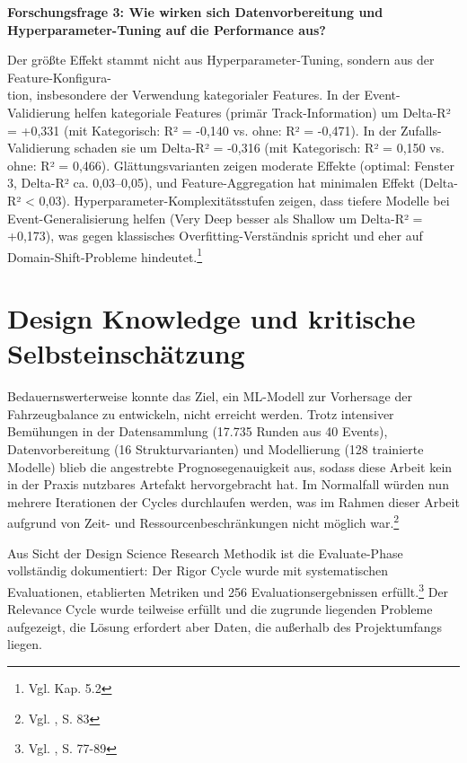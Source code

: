 \textbf{Forschungsfrage 3: Wie wirken sich Datenvorbereitung und Hyperparameter-Tuning auf die Performance aus?}

Der größte Effekt stammt nicht aus Hyperparameter-Tuning, sondern aus der Feature-Konfigura-\\tion, insbesondere der Verwendung kategorialer Features. In der Event-Validierung helfen kategoriale Features (primär Track-Information) um Delta-R² = +0,331 (mit Kategorisch: R² = -0,140 vs. ohne: R² = -0,471). In der Zufalls-Validierung schaden sie um Delta-R² = -0,316 (mit Kategorisch: R² = 0,150 vs. ohne: R² = 0,466). Glättungsvarianten zeigen moderate Effekte (optimal: Fenster 3, Delta-R² ca. 0,03–0,05), und Feature-Aggregation hat minimalen Effekt (Delta-R² < 0,03). Hyperparameter-Komplexitätsstufen zeigen, dass tiefere Modelle bei Event-Generalisierung helfen (Very Deep besser als Shallow um Delta-R² = +0,173), was gegen klassisches Overfitting-Verständnis spricht und eher auf Domain-Shift-Probleme hindeutet.\footnote{Vgl. Kap. 5.2}



\section{Design Knowledge und kritische Selbsteinschätzung}

Bedauernswerterweise konnte das Ziel, ein \ac{ML}-Modell zur Vorhersage der Fahrzeugbalance zu entwickeln, nicht erreicht werden. Trotz intensiver Bemühungen in der Datensammlung (17.735 Runden aus 40 Events), Datenvorbereitung (16 Strukturvarianten) und Modellierung (128 trainierte Modelle) blieb die angestrebte Prognosegenauigkeit aus, sodass diese Arbeit kein in der Praxis nutzbares Artefakt hervorgebracht hat. Im Normalfall würden nun mehrere Iterationen der Cycles durchlaufen werden, was im Rahmen dieser Arbeit aufgrund von Zeit- und Ressourcenbeschränkungen nicht möglich war.\footnote{Vgl. \cite{Hevner2004}, S. 83}

Aus Sicht der Design Science Research Methodik ist die Evaluate-Phase vollständig dokumentiert: Der Rigor Cycle wurde mit systematischen Evaluationen, etablierten Metriken und 256 Evaluationsergebnissen erfüllt.\footnote{Vgl. \cite{Venable2016}, S. 77-89} Der Relevance Cycle wurde teilweise erfüllt und die zugrunde liegenden Probleme aufgezeigt, die Lösung erfordert aber Daten, die außerhalb des Projektumfangs liegen.

